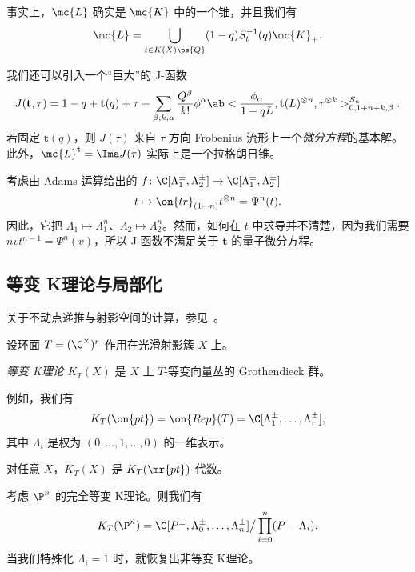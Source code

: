 \begin{prop}
    事实上，\(\mc{L}\) 确实是 \(\mc{K}\) 中的一个锥，并且我们有
    \[ \mc{L} = \bigcup_{t \in K(X)\ps{Q}} (1-q) S_{t}^{-1}(q) \mc{K}_+. \]
\end{prop}

我们还可以引入一个“巨大”的 J-函数
\[ J(\mathbf{t}, \tau) = 1-q + \mathbf{t}(q) + \tau + \sum_{\beta, k, \alpha} \frac{Q^{\beta}}{k!} \phi^{\alpha} \ab< \frac{\phi_{\alpha}}{1-qL}, \mathbf{t}(L)^{\otimes n}, \tau^{\otimes k}>_{0,1+n+k,\beta}^{S_n}. \]
若固定 \(\mathbf{t}(q)\)，则 \(J(\tau)\) 来自 \(\tau\) 方向 Frobenius 流形上一个\textit{微分方程}的基本解。此外，\(\mc{L}^{\mathbf{t}}=  \Ima J(\tau)\) 实际上是一个拉格朗日锥。

\begin{exm}
    考虑由 Adams 运算给出的 \(f \colon \C[\Lambda_1^{\pm}, \Lambda_2^{\pm}] \to \C[\Lambda_1^{\pm}, \Lambda_2^{\pm}]\)
    \[ t \mapsto \on{tr}_{(1\cdots n)} t^{\otimes n} = \Psi^n (t). \]
    因此，它把 \(\Lambda_1 \mapsto \Lambda_1^n\)、\(\Lambda_2 \mapsto \Lambda_2^n\)。然而，如何在 \(t\) 中求导并不清楚，因为我们需要 \(nv t^{n-1} = \Psi^n(v)\)，所以 J-函数不满足关于 \(\mathbf{t}\) 的量子微分方程。
\end{exm}

\subsection{等变 K理论与局部化}%
\label{sub:Equivariant K-theory and localization}

关于不动点递推与射影空间的计算，参见~\cite{GiventalK2}。

设环面 \(T = (\C^{\times})^r\) 作用在光滑射影簇 \(X\) 上。

\begin{defn}
    \textit{等变 K理论} \(K_T(X)\) 是 \(X\) 上 \(T\)-等变向量丛的 Grothendieck 群。
\end{defn}

\begin{exm}
    例如，我们有
    \[ K_T(\on{pt}) = \on{Rep}(T) = \C[\Lambda_1^{\pm}, \ldots, \Lambda_r^{\pm}], \]
    其中 \(\Lambda_i\) 是权为 \((0, \ldots, 1, \ldots, 0)\) 的一维表示。
\end{exm}

\begin{rmk}
    对任意 \(X\)，\(K_T(X)\) 是 \(K_T(\mr{pt})\)-代数。
\end{rmk}

\begin{exm}
    考虑 \(\P^n\) 的完全等变 K理论。则我们有
    \[ K_T(\P^n) = \C[P^{\pm}, \Lambda_0^{\pm}, \ldots, \Lambda_n^{\pm}] \big/ \prod_{i=0}^n (P-\Lambda_i). \]
    当我们特殊化 \(\Lambda_i = 1\) 时，就恢复出非等变 K理论。
\end{exm}


